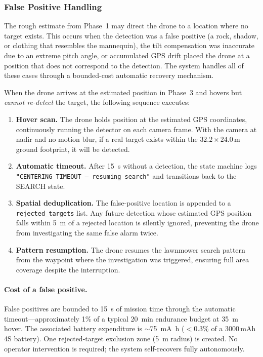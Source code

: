 \subsubsection{False Positive Handling}\label{sec:false-positive-handling}

The rough estimate from Phase~1 may direct the drone to a location where no target exists.  This occurs when the detection was a false positive (a rock, shadow, or clothing that resembles the mannequin), the tilt compensation was inaccurate due to an extreme pitch angle, or accumulated GPS drift placed the drone at a position that does not correspond to the detection.  The system handles all of these cases through a bounded-cost automatic recovery mechanism.

When the drone arrives at the estimated position in Phase~3 and hovers but \emph{cannot re-detect} the target, the following sequence executes:

\begin{enumerate}
  \item \textbf{Hover scan.}  The drone holds position at the estimated GPS coordinates, continuously running the detector on each camera frame.  With the camera at nadir and no motion blur, if a real target exists within the $32.2 \times 24.0$\,m ground footprint, it will be detected.

  \item \textbf{Automatic timeout.}  After \SI{15}{\second} without a detection, the state machine logs \texttt{"CENTERING TIMEOUT --- resuming search"} and transitions back to the SEARCH state.

  \item \textbf{Spatial deduplication.}  The false-positive location is appended to a \texttt{rejected\_targets} list.  Any future detection whose estimated GPS position falls within \SI{5}{\metre} of a rejected location is silently ignored, preventing the drone from investigating the same false alarm twice.

  \item \textbf{Pattern resumption.}  The drone resumes the lawnmower search pattern from the waypoint where the investigation was triggered, ensuring full area coverage despite the interruption.
\end{enumerate}

\paragraph{Cost of a false positive.}
False positives are bounded to \SI{15}{\second} of mission time through the automatic timeout---approximately 1\% of a typical \SI{20}{\minute} endurance budget at \SI{35}{\metre} hover.  The associated battery expenditure is $\sim$\SI{75}{\milli\ampere\hour} ($<$0.3\% of a 3000\,mAh 4S battery).  One rejected-target exclusion zone (\SI{5}{\metre} radius) is created.  No operator intervention is required; the system self-recovers fully autonomously.

